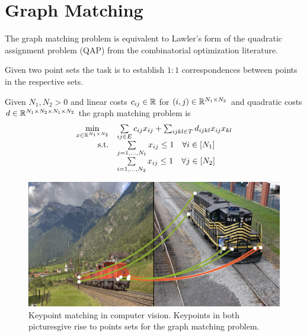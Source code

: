 \section{Graph Matching}
\label{sec:graph-matching}

The graph matching problem is equivalent to Lawler's form of the quadratic assignment problem (QAP) from the combinatorial optimization literature.

Given two point sets the task is to establish $1:1$ correspondences between points in the respective sets.

\begin{definition}
Given $N_1,N_2 > 0$ and linear costs $c_{ij} \in \mathbb{R}$ for $(i,j) \in \mathbb{R}^{N_1 \times N_2}$ and quadratic costs $d \in \mathbb{R}^{N_1 \times N_2 \times N_1 \times N_2}$ the graph matching problem is
\begin{equation}
    \begin{array}{rl}
    \min\limits_{x \in \mathbb{R}^{N_1 \times N_2}} & \sum\limits_{ij \in E} c_{ij} x_{ij} + \sum_{ijkl \in T} d_{ijkl} x_{ij} x_{kl} \\ 
    \text{s.t.} 
    & \sum\limits_{j=1,\ldots,N_1} x_{ij} \leq 1 \quad \forall i\in [N_1] \\
    & \sum\limits_{i=1,\ldots,N_2} x_{ij} \leq 1 \quad \forall j\in [N_2] \\
    \end{array}
\end{equation}
\end{definition}

\begin{figure}[H]
    \begin{center}
        \includegraphics[width=\columnwidth]{images/train-matching.png}
        \caption{Keypoint matching in computer vision. Keypoints in both picturesgive rise to points sets for the graph matching problem.}
        \label{fig:cell-tracking}
    \end{center}
\end{figure}

